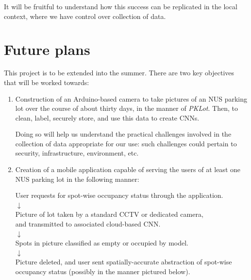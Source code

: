 \documentclass[a4paper, 11pt]{article} %
\begin{document}
	It will be fruitful to understand how this success can be replicated in the local context, where we 
	have control over collection of data.

\section{Future plans}

	This project is to be extended into the summer. There are two key objectives that will be worked 
	towards:
	\begin{enumerate}
		\item Construction of an Arduino-based camera to take pictures of an NUS parking lot over the 
		course of about thirty days, in the manner of \textit{PKLot}. Then, to clean, label, securely store, 
		and use this data to create CNNs.
			\begin{adjustwidth}{6mm}{}
				Doing so will help us understand the practical challenges involved in the collection of  
				data appropriate for our use: such challenges could pertain to security, infrastructure, 
				environment,  etc.
			\end{adjustwidth}
		\item Creation of a mobile application capable of serving the users of at least one NUS parking lot 
		in the following manner:
			\begin{center}
				User requests for spot-wise occupancy status through the application. \\
				$\downarrow$ \\
				Picture of lot taken by a standard CCTV or dedicated camera, \\
				and transmitted to associated cloud-based CNN. \\
				$\downarrow$ \\
				Spots in picture classified as empty or occupied by model. \\
				$\downarrow$ \\
				Picture deleted, and user sent spatially-accurate abstraction of spot-wise
				occupancy status (possibly in the manner pictured below).
			\end{center}
		\end{enumerate}
	
\end{document}
